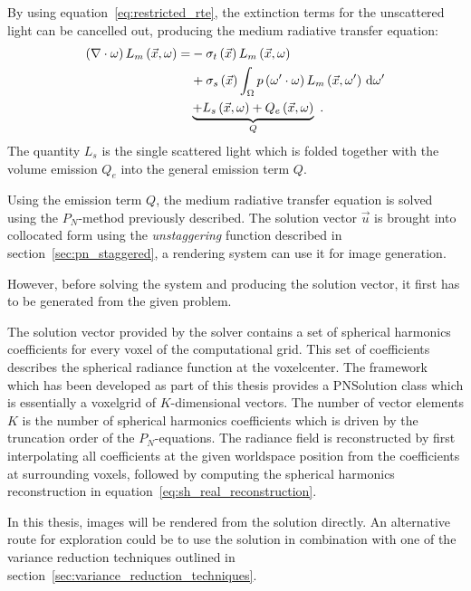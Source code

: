 By using equation~\ref{eq:restricted_rte}, the extinction terms for the unscattered light can be cancelled out, producing the medium radiative transfer equation:
\begin{align}
\left(\nabla\cdot\omega\right)L_m\left(\vec{x}, \omega \right)
=&
-\sigma_t\left(\vec{x}\right) L_m\left(\vec{x}, \omega \right)\nonumber\\
&
+\sigma_s\left(\vec{x}\right) \int_{\Omega}
{
p\left(\omega'\cdot\omega\right)L_m\left(\vec{x}, \omega' \right)\,\mathrm{d}\omega'
}
\nonumber
\\
&
\underbrace
{
+L_s\left(\vec{x}, \omega\right)
+Q_e\left(\vec{x}, \omega\right)
}_{Q}
\nonumber
\  .
\end{align}
The quantity $L_s$ is the single scattered light which is folded together with the volume emission $Q_e$ into the general emission term $Q$.

Using the emission term $Q$, the medium radiative transfer equation is solved using the $P_N$-method previously described. The solution vector $\vec{u}$ is brought into collocated form using the \emph{unstaggering} function described in section~\ref{sec:pn_staggered}, a rendering system can use it for image generation. 

However, before solving the system and producing the solution vector, it first has to be generated from the given problem.

The solution vector provided by the solver contains a set of spherical harmonics coefficients for every voxel of the computational grid. This set of coefficients describes the spherical radiance function at the voxelcenter. The framework which has been developed as part of this thesis provides a PNSolution class which is essentially a voxelgrid of $K$-dimensional vectors. The number of vector elements $K$ is the number of spherical harmonics coefficients which is driven by the truncation order of the $P_N$-equations. The radiance field is reconstructed by first interpolating all coefficients at the given worldspace position from the coefficients at surrounding voxels, followed by computing the spherical harmonics reconstruction in equation~\ref{eq:sh_real_reconstruction}.

In this thesis, images will be rendered from the solution directly. An alternative route for exploration could be to use the solution in combination with one of the variance reduction techniques outlined in section~\ref{sec:variance_reduction_techniques}.

